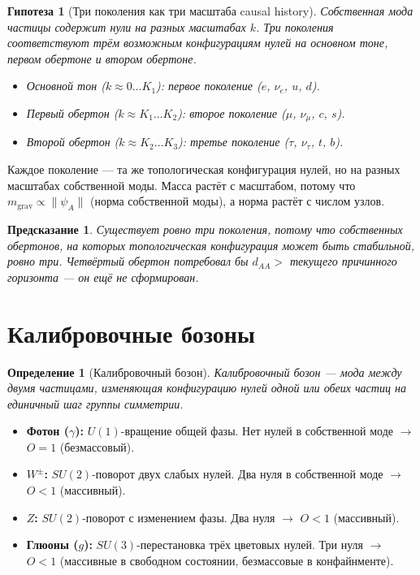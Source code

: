 \documentclass[11pt,a4paper]{article}
\newtheorem{definition}{Определение}[section]
\newtheorem{hypothesis}{Гипотеза}[section]
\newtheorem{prediction}{Предсказание}[section]
\theoremstyle{definition}
\begin{document}
\begin{hypothesis}[Три поколения как три масштаба causal history]
Собственная мода частицы содержит нули на разных масштабах $k$. Три поколения соответствуют трём возможным конфигурациям нулей на основном тоне, первом обертоне и втором обертоне.
\begin{itemize}
    \item Основной тон ($k \approx 0 \dots K_1$): первое поколение ($e$, $\nu_e$, $u$, $d$).
    \item Первый обертон ($k \approx K_1 \dots K_2$): второе поколение ($\mu$, $\nu_\mu$, $c$, $s$).
    \item Второй обертон ($k \approx K_2 \dots K_3$): третье поколение ($\tau$, $\nu_\tau$, $t$, $b$).
\end{itemize}
\end{hypothesis}

Каждое поколение — та же топологическая конфигурация нулей, но на разных масштабах собственной моды. Масса растёт с масштабом, потому что $m_{\text{grav}} \propto \|\psi_A\|$ (норма собственной моды), а норма растёт с числом узлов.

\begin{prediction}
Существует ровно три поколения, потому что собственных обертонов, на которых топологическая конфигурация может быть стабильной, ровно три. Четвёртый обертон потребовал бы $d_{AA} >$ текущего причинного горизонта — он ещё не сформирован.
\end{prediction}

\section{Калибровочные бозоны}

\begin{definition}[Калибровочный бозон]
Калибровочный бозон — мода между двумя частицами, изменяющая конфигурацию нулей одной или обеих частиц на единичный шаг группы симметрии.
\end{definition}

\begin{itemize}
    \item \textbf{Фотон ($\gamma$):} $U(1)$-вращение общей фазы. Нет нулей в собственной моде $\to$ $O = 1$ (безмассовый).
    \item \textbf{$W^\pm$:} $SU(2)$-поворот двух слабых нулей. Два нуля в собственной моде $\to$ $O < 1$ (массивный).
    \item \textbf{$Z$:} $SU(2)$-поворот с изменением фазы. Два нуля $\to$ $O < 1$ (массивный).
    \item \textbf{Глюоны ($g$):} $SU(3)$-перестановка трёх цветовых нулей. Три нуля $\to$ $O < 1$ (массивные в свободном состоянии, безмассовые в конфайнменте).
\end{itemize}
\end{document}
